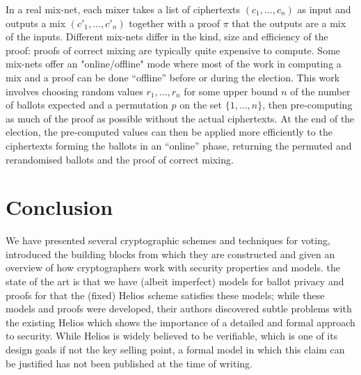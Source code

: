 \documentclass[envcountsame]{llncs}
\begin{document}
In a real mix-net, each mixer takes a list of ciphertexts $(c_1, \ldots, c_n)$
as input and outputs a mix $(c'_1, \ldots, c'_n)$ together with a proof $\pi$
that the outputs are a mix of the inputs. Different mix-nets differ in the kind,
size and efficiency of the proof: proofs of correct mixing are typically
quite expensive to compute. Some mix-nets offer an "online/offline" mode where
most of the work in computing a mix and a proof can be done ``offline'' before
or during the election. This work involves choosing random values $r_1, \ldots,
r_n$ for some upper bound $n$ of the number of ballots expected and a
permutation $p$ on the set $\{1, \ldots, n\}$, then pre-computing as much of the
proof as possible without the actual ciphertexts. At the end of the election,
the pre-computed values can then be applied more efficiently to the ciphertexts
forming the ballots in an ``online'' phase, returning the permuted and
rerandomised ballots and the proof of correct mixing.

\section{Conclusion}

We have presented several cryptographic schemes and techniques for voting,
introduced the building blocks from which they are constructed and given an
overview of how cryptographers work with security properties and models. the
state of the art is that we have (albeit imperfect) models for ballot privacy
and proofs for that the (fixed) Helios scheme satisfies these models; while
these models and proofs were developed, their authors discovered subtle
problems with the existing Helios which shows the importance of a detailed and
formal approach to security. While Helios is widely believed to be verifiable,
which is one of its design goals if not the key selling point, a formal model
in which this claim can be justified has not been published at the time of
writing.
\end{document}
